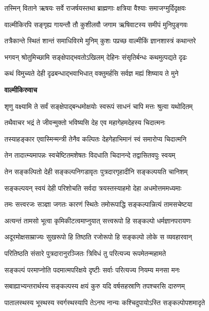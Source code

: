 \twolineshloka
{तस्मिन् विताने ऋषयः सर्वे राजर्षयस्तथा}
{ब्राह्मणाः क्षत्रिया वैश्याः समाजग्मुर्दिदृक्षवः} %

\twolineshloka
{वाल्मीकिरपि सङ्गृह्य गायन्तौ तौ कुशीलवौ}
{जगाम ऋषिवाटस्य समीपं मुनिपुङ्गवः} %

\twolineshloka
{तत्रैकान्ते स्थितं शान्तं समाधिविरमे मुनिम्}
{कुशः पप्रच्छ वाल्मीकिं ज्ञानशास्त्रं कथान्तरे} %

\twolineshloka
{भगवन् श्रोतुमिच्छामि सङ्क्षेपाद्भवतोऽखिलम्}
{देहिनः संसृतिर्बन्धः कथमुत्पद्यते दृढः} %

\twolineshloka
{कथं विमुच्यते देही दृढबन्धाद्भवाभिधात्}
{वक्तुमर्हसि सर्वज्ञ मह्यं शिष्याय ते मुने} %

\textbf{वाल्मीकिरुवाच}

\twolineshloka
{शृणु वक्ष्यामि ते सर्वं सङ्क्षेपाद्बन्धमोक्षयोः}
{स्वरूपं साधनं चापि मत्तः श्रुत्वा यथोदितम्} %

\twolineshloka
{तथैवाचर भद्रं ते जीवन्मुक्तो भविष्यसि}
{देह एव महागेहमदेहस्य चिदात्मनः} %

\twolineshloka
{तस्याहङ्कार एवास्मिन्मन्त्री तेनैव कल्पितः}
{देहगेहाभिमानं स्वं समारोप्य चिदात्मनि} %

\twolineshloka
{तेन तादात्म्यमापन्नः स्वचेष्टितमशेषतः}
{विदधाति चिदानन्दे तद्वासितवपुः स्वयम्} %

\twolineshloka
{तेन सङ्कल्पितो देही सङ्कल्पनिगडावृतः}
{पुत्रदारगृहादीनि सङ्कल्पयति चानिशम्} %

\twolineshloka
{सङ्कल्पयन् स्वयं देही परिशोचति सर्वदा}
{त्रयस्तस्याहमो देहा अधमोत्तममध्यमाः} %

\twolineshloka
{तमः सत्त्वरजः सञ्ज्ञा जगतः कारणं स्थितेः}
{तमोरूपाद्धि सङ्कल्पान्नित्यं तामसचेष्टया} %

\twolineshloka
{अत्यन्तं तामसो भूत्वा कृमिकीटत्वमाप्नुयात्}
{सत्त्वरूपो हि सङ्कल्पो धर्मज्ञानपरायणः} %

\twolineshloka
{अदूरमोक्षसाम्राज्यः सुखरूपो हि तिष्ठति}
{रजोरूपो हि सङ्कल्पो लोके स व्यवहारवान्} %

\twolineshloka
{परितिष्ठति संसारे पुत्रदारानुरञ्जितः}
{त्रिविधं तु परित्यज्य रूपमेतन्महामते} %

\twolineshloka
{सङ्कल्पं परमाप्नोति पदमात्मपरिक्षये}
{दृष्टीः सर्वाः परित्यज्य नियम्य मनसा मनः} %

\twolineshloka
{सबाह्याभ्यन्तरार्थस्य सङ्कल्पस्य क्षयं कुरु}
{यदि वर्षसहस्राणि तपश्चरसि दारुणम्} %

\twolineshloka
{पातालस्थस्य भूस्थस्य स्वर्गस्थस्यापि तेऽनघ}
{नान्यः कश्चिदुपायोऽस्ति सङ्कल्पोपशमादृते} %

